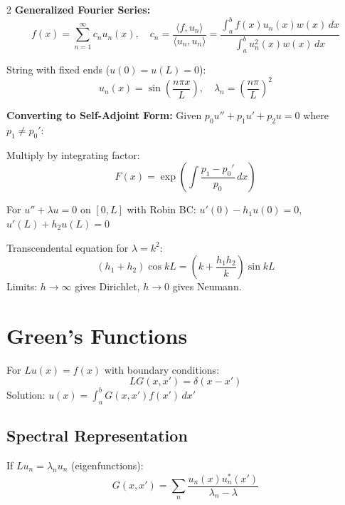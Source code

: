 \documentclass[10pt,a4paper]{article}
\begin{document}
\begin{multicols}{2}
\textbf{Generalized Fourier Series:}
\begin{equation}
f(x) = \sum_{n=1}^{\infty} c_n u_n(x), \quad c_n = \frac{\langle f, u_n \rangle}{\langle u_n, u_n \rangle} = \frac{\int_a^b f(x)u_n(x)w(x)\,dx}{\int_a^b u_n^2(x)w(x)\,dx}
\end{equation}

\begin{example}
String with fixed ends ($u(0)=u(L)=0$):
\begin{equation}
u_n(x) = \sin\left(\frac{n\pi x}{L}\right), \quad \lambda_n = \left(\frac{n\pi}{L}\right)^2
\end{equation}
\end{example}

\textbf{Converting to Self-Adjoint Form:}
Given $p_0 u'' + p_1 u' + p_2 u = 0$ where $p_1 \neq p_0'$:

Multiply by integrating factor:
\begin{equation}
F(x) = \exp\left(\int\frac{p_1 - p_0'}{p_0}\,dx\right)
\end{equation}

\begin{example}
For $u'' + \lambda u = 0$ on $[0,L]$ with Robin BC:
$u'(0) - h_1 u(0) = 0$, $u'(L) + h_2 u(L) = 0$

Transcendental equation for $\lambda = k^2$:
\begin{equation}
(h_1 + h_2)\cos kL = \left(k + \frac{h_1 h_2}{k}\right)\sin kL
\end{equation}
Limits: $h \to \infty$ gives Dirichlet, $h \to 0$ gives Neumann.
\end{example}

\section{Green's Functions}

\begin{keyformula}
For $Lu(x) = f(x)$ with boundary conditions:
\begin{equation}
LG(x,x') = \delta(x-x')
\end{equation}
Solution: $\displaystyle u(x) = \int_a^b G(x,x')f(x')\,dx'$
\end{keyformula}

\subsection{Spectral Representation}
If $Lu_n = \lambda_n u_n$ (eigenfunctions):
\begin{equation}
G(x,x') = \sum_n \frac{u_n(x)u_n^*(x')}{\lambda_n - \lambda}
\end{equation}


\end{multicols}
\end{document}
